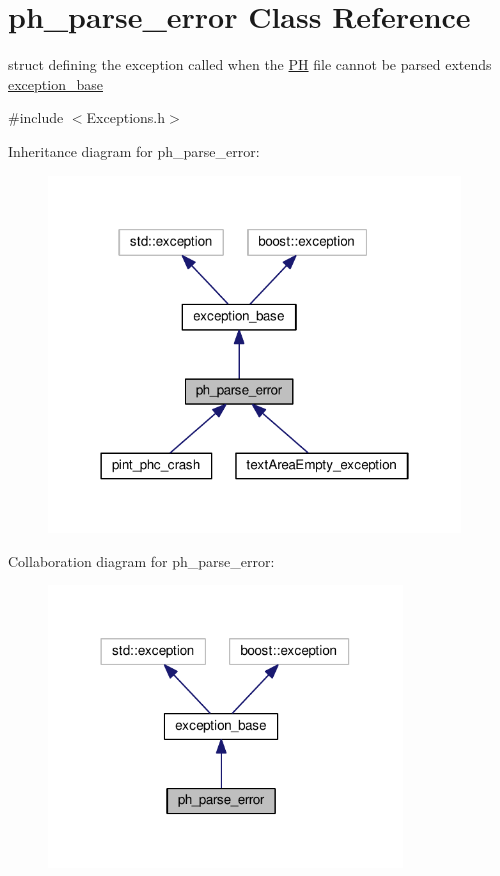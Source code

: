 \hypertarget{structph__parse__error}{\section{ph\+\_\+parse\+\_\+error Class Reference}
\label{structph__parse__error}
}


struct defining the exception called when the \hyperlink{classPH}{P\+H} file cannot be parsed extends \hyperlink{structexception__base}{exception\+\_\+base}  




{\ttfamily \#include $<$Exceptions.\+h$>$}



Inheritance diagram for ph\+\_\+parse\+\_\+error\+:\nopagebreak
\begin{figure}[H]
\begin{center}
\leavevmode
\includegraphics[width=310pt]{structph__parse__error__inherit__graph}
\end{center}
\end{figure}


Collaboration diagram for ph\+\_\+parse\+\_\+error\+:\nopagebreak
\begin{figure}[H]
\begin{center}
\leavevmode
\includegraphics[width=266pt]{structph__parse__error__coll__graph}
\end{center}
\end{figure}


